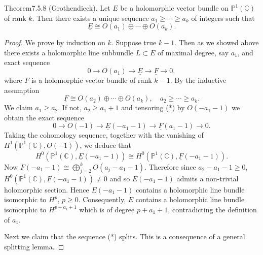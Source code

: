 \begin{originaltheorem}{Theorem}{7.5.8}
(Grothendieck). Let $E$ be a holomorphic vector bundle on $\mathbb{P}^1(\mathbb{C})$ of rank $k$. Then there exists a unique sequence $a_1\geq\cdots\geq a_k$ of integers such that
\[
\underline{E}\cong O(a_1)\oplus\cdots\oplus O(a_k).
\]
\end{originaltheorem}
\begin{proof}
We prove by induction on $k$. Suppose true $k-1$. Then as we showed above there exists a holomorphic line subbundle $L\subset E$ of maximal degree, say $a_1$, and exact sequence
\[
0\to O(a_1)\to\underline{E}\to\underline{F}\to0,\tag{*}\label{eq:7:star:7}
\]
where $F$ is a holomorphic vector bundle of rank $k-1$. By the inductive assumption
\[
\underline{F}\cong O(a_2)\oplus\cdots\oplus O(a_k),\quad a_2\geq\cdots\geq a_k.
\]
We claim $a_1\geq a_2$. If not, $a_2\geq a_1+1$ and tensoring (*) by $O(-a_1-1)$ we obtain the exact sequence
\[
0\to O(-1)\to\underline{E}(-a_1-1)\to\underline{F}(a_1-1)\to0.
\]
Taking the cohomology sequence, together with the vanishing of $H^1(\mathbb{P}^1(\mathbb{C}),O(-1))$, we deduce that
\[
H^0(\mathbb{P}^1(\mathbb{C}),\underline{E}(-a_1-1))\cong H^0(\mathbb{P}^1(\mathbb{C}),\underline{F}(-a_1-1)).
\]
Now $\underline{F}(-a_1-1)\cong\bigoplus_{j=2}^k O(a_j-a_1-1)$. Therefore since $a_2-a_1-1\geq0$, $H^0(\mathbb{P}^1(\mathbb{C}),\underline{F}(-a_1-1))\ne0$ and so $E(-a_1-1)$ admits a non-trivial holomorphic section. Hence $E(-a_1-1)$ contains a holomorphic line bundle isomorphic to $H^p$, $p\geq0$. Consequently, $E$ contains a holomorphic line bundle isomorphic to $H^{p+a_1+1}$ which is of degree $p+a_1+1$, contradicting the definition of $a_1$.

Next we claim that the sequence (*) splits. This is a consequence of a general splitting lemma.


\end{proof}
